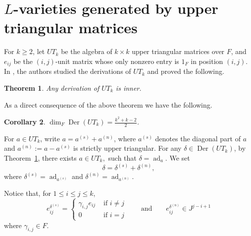 \documentclass[a4paper,reqno]{amsart}
\newtheorem{theorem}{Theorem}
\newtheorem{corollary}[theorem]{Corollary}
\theoremstyle{definition}
\numberwithin{equation}{section}
\numberwithin{theorem}{section}
\DeclareMathOperator{\ad}{ad}
\DeclareMathOperator{\D}{Der}
\newcommand{\black}{\color{black}}
\begin{document}
\section{$L$-varieties generated by upper triangular matrices}


For $k\geq 2$, let $UT_k$ be the algebra of $k \times k$ upper triangular matrices over $F$, and $e_{ij}$ be the $(i,j)$-unit matrix whose only nonzero entry is $1_F$ in position $(i,j).$ In \cite{CoelhoPolcinoMilies1993}, the authors studied the derivations of $UT_k$ and proved the following. 
\begin{theorem} \label{Thm Der(UT_n)}
	Any derivation of $UT_k$ is inner.
\end{theorem}
As a direct consequence of the above theorem we have the following.
\begin{corollary}
    $\dim_F \D(UT_k)=\frac{k^2 +k -2}{2}$.
\end{corollary}

For $a \in UT_k$, write $a = a^{(s)} + a^{(n)}$, where $a^{(s)}$ denotes the diagonal part of $a$
and $a^{(n)} := a - a^{(s)}$ is strictly upper triangular.
\black
For any $\delta\in \D(UT_k)$, by Theorem~\ref{Thm Der(UT_n)},  there exists $a\in UT_k,$ such that $\delta=\ad_a.$ We set
\begin{equation}\label{eq: delta as delta^s and delta^n}
    \delta=\delta^{(s)}+\delta^{(n)},
\end{equation}
where $\delta^{(s)}=\ad_{a^{(s)}}$  
and $\delta^{(n)}=\ad_{a^{(n)}}.$ 

Notice that, for $1\leq i\leq j \leq k$,
\begin{equation}\label{eq: action of delta^s and delta^n on e_ij}
    e_{ij}^{\delta^{(s)}}=\begin{cases}
    \gamma_{i,j} e_{ij} & \mbox{ if } i\neq j\\
    0 & \mbox{ if } i= j
\end{cases} \quad \quad \text{and} \quad \quad e_{ij}^{\delta^{(n)}}\in J^{j-i+1}
\end{equation}
where $ \gamma_{i,j}
\in F$.

\smallskip
\end{document}
